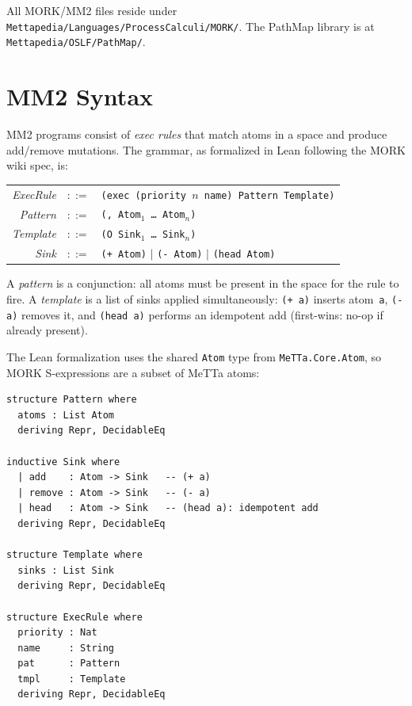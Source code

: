 \documentclass[11pt]{article}
\theoremstyle{definition}
\theoremstyle{remark}
\newcommand{\MORK}{\textup{MORK}}
\newcommand{\MeTTa}{\textup{MeTTa}}
\newcommand{\PathMap}{\textup{PathMap}}
\begin{document}
All \MORK{}/MM2 files reside under
\texttt{Mettapedia/Languages/ProcessCalculi/MORK/}.
The \PathMap{} library is at \texttt{Mettapedia/OSLF/PathMap/}.

\section{MM2 Syntax}
\label{sec:syntax}

MM2 programs consist of \emph{exec rules} that match atoms in a space and
produce add/remove mutations.
The grammar, as formalized in Lean following the MORK wiki spec, is:
\begin{center}
\begin{tabular}{@{}rcl@{}}
\textit{ExecRule}  & $::=$ & \texttt{(exec (priority $n$ name) Pattern Template)} \\
\textit{Pattern}   & $::=$ & \texttt{(, Atom$_1$ \ldots{} Atom$_n$)} \\
\textit{Template}  & $::=$ & \texttt{(O Sink$_1$ \ldots{} Sink$_n$)} \\
\textit{Sink}      & $::=$ & \texttt{(+ Atom)} $\mid$ \texttt{(- Atom)} $\mid$ \texttt{(head Atom)} \\
\end{tabular}
\end{center}

\noindent
A \emph{pattern} is a conjunction: all atoms must be present in the space
for the rule to fire.
A \emph{template} is a list of sinks applied simultaneously: \texttt{(+ a)}
inserts atom~\texttt{a}, \texttt{(- a)} removes it, and \texttt{(head a)}
performs an idempotent add (first-wins: no-op if already present).

The Lean formalization uses the shared \texttt{Atom} type from
\texttt{MeTTa.Core.Atom}, so \MORK{} S-expressions are a subset of \MeTTa{}
atoms:

\begin{lstlisting}[caption={MM2 syntax types (\texttt{Syntax.lean}).}]
structure Pattern where
  atoms : List Atom
  deriving Repr, DecidableEq

inductive Sink where
  | add    : Atom -> Sink   -- (+ a)
  | remove : Atom -> Sink   -- (- a)
  | head   : Atom -> Sink   -- (head a): idempotent add
  deriving Repr, DecidableEq

structure Template where
  sinks : List Sink
  deriving Repr, DecidableEq

structure ExecRule where
  priority : Nat
  name     : String
  pat      : Pattern
  tmpl     : Template
  deriving Repr, DecidableEq
\end{lstlisting}
\end{document}
